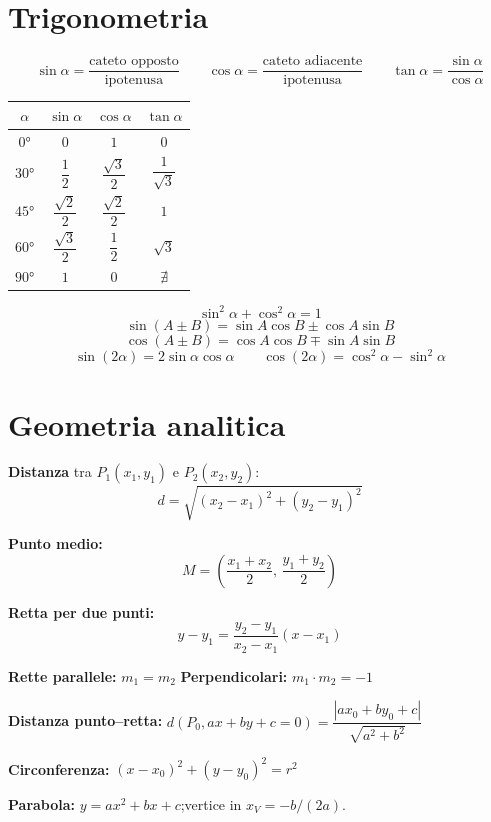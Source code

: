 \documentclass[12pt, a4paper, twoside, openright]{book}
\theoremstyle{definition}
\begin{document}
\section{Trigonometria}

\begin{defbox}
\[
\sin\alpha = \frac{\text{cateto opposto}}{\text{ipotenusa}} \qquad
\cos\alpha = \frac{\text{cateto adiacente}}{\text{ipotenusa}} \qquad
\tan\alpha = \frac{\sin\alpha}{\cos\alpha}
\]
\end{defbox}

\begin{defbox}
\begin{center}
\renewcommand{\arraystretch}{1.4}
\begin{tabular}{cccc}
\toprule
$\alpha$ & $\sin\alpha$ & $\cos\alpha$ & $\tan\alpha$ \\
\midrule
$0°$ & $0$ & $1$ & $0$ \\
$30°$ & $\dfrac{1}{2}$ & $\dfrac{\sqrt{3}}{2}$ & $\dfrac{1}{\sqrt{3}}$ \\
$45°$ & $\dfrac{\sqrt{2}}{2}$ & $\dfrac{\sqrt{2}}{2}$ & $1$ \\
$60°$ & $\dfrac{\sqrt{3}}{2}$ & $\dfrac{1}{2}$ & $\sqrt{3}$ \\
$90°$ & $1$ & $0$ & $\nexists$ \\
\bottomrule
\end{tabular}
\end{center}
\end{defbox}

\begin{formulario}
\[
\sin^2\alpha + \cos^2\alpha = 1
\]
\[
\sin(A \pm B) = \sin A \cos B \pm \cos A \sin B
\]
\[
\cos(A \pm B) = \cos A \cos B \mp \sin A \sin B
\]
\[
\sin(2\alpha) = 2\sin\alpha\cos\alpha \qquad \cos(2\alpha) = \cos^2\alpha - \sin^2\alpha
\]
\end{formulario}

\section{Geometria analitica}

\begin{formulario}
\textbf{Distanza} tra $P_1(x_1,y_1)$ e $P_2(x_2,y_2)$:
\[
d = \sqrt{(x_2-x_1)^2 + (y_2-y_1)^2}
\]

\textbf{Punto medio:}
\[
M = \left(\frac{x_1+x_2}{2},\,\frac{y_1+y_2}{2}\right)
\]

\textbf{Retta per due punti:}
\[
y - y_1 = \frac{y_2-y_1}{x_2-x_1}(x - x_1)
\]

\textbf{Rette parallele:} $m_1 = m_2$ \qquad \textbf{Perpendicolari:} $m_1 \cdot m_2 = -1$

\textbf{Distanza punto--retta:} $d\!\left(P_0, ax+by+c=0\right) = \dfrac{|ax_0+by_0+c|}{\sqrt{a^2+b^2}}$

\textbf{Circonferenza:} $(x - x_0)^2 + (y - y_0)^2 = r^2$

\textbf{Parabola:} $y = ax^2 + bx + c$;\quad vertice in $x_V = -b/(2a)$.
\end{formulario}
\end{document}
